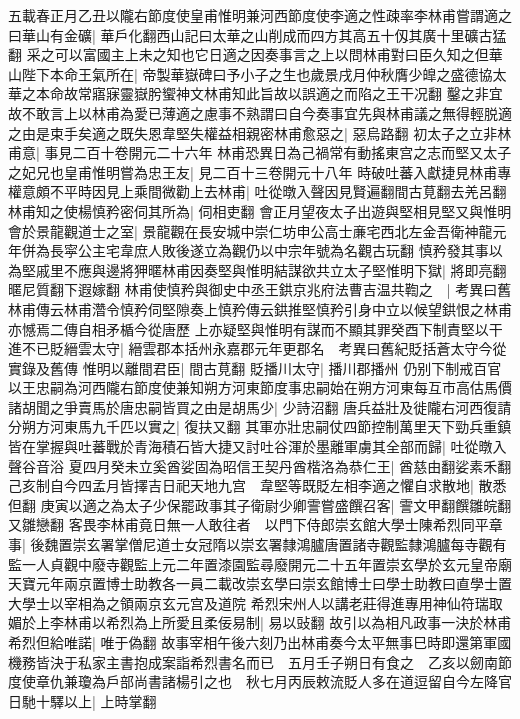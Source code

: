 五載春正月乙丑以隴右節度使皇甫惟明兼河西節度使李適之性疎率李林甫嘗謂適之曰華山有金礦|{
	華戶化翻西山記曰太華之山削成而四方其高五十仭其廣十里礦古猛翻}
采之可以富國主上未之知也它日適之因奏事言之上以問林甫對曰臣久知之但華山陛下本命王氣所在|{
	帝製華嶽碑曰予小子之生也歲景戌月仲秋膺少皥之盛德協太華之本命故常寤寐靈嶽肹蠁神文林甫知此旨故以誤適之而陷之王干况翻}
鑿之非宜故不敢言上以林甫為愛已薄適之慮事不熟謂曰自今奏事宜先與林甫議之無得輕脱適之由是束手矣適之既失恩韋堅失權益相親密林甫愈惡之|{
	惡烏路翻}
初太子之立非林甫意|{
	事見二百十卷開元二十六年}
林甫恐異日為己禍常有動搖東宫之志而堅又太子之妃兄也皇甫惟明嘗為忠王友|{
	見二百十三卷開元十八年}
時破吐蕃入獻捷見林甫專權意頗不平時因見上乘間微勸上去林甫|{
	吐從暾入聲因見賢遍翻間古莧翻去羌呂翻}
林甫知之使楊慎矜密伺其所為|{
	伺相吏翻}
會正月望夜太子出遊與堅相見堅又與惟明會於景龍觀道士之室|{
	景龍觀在長安城中崇仁坊申公高士亷宅西北左金吾衛神龍元年併為長寜公主宅韋庶人敗後遂立為觀仍以中宗年號為名觀古玩翻}
慎矜發其事以為堅戚里不應與邊將狎暱林甫因奏堅與惟明結謀欲共立太子堅惟明下獄|{
	將即亮翻暱尼質翻下遐嫁翻}
林甫使慎矜與御史中丞王鉷京兆府法曹吉温共鞫之　|{
	考異曰舊林甫傳云林甫濳令慎矜伺堅隙奏上慎矜傳云鉷推堅慎矜引身中立以候望鉷恨之林甫亦憾焉二傳自相矛楯今從唐歷}
上亦疑堅與惟明有謀而不顯其罪癸酉下制責堅以干進不已貶縉雲太守|{
	縉雲郡本括州永嘉郡元年更郡名　考異曰舊紀貶括蒼太守今從實錄及舊傳}
惟明以離間君臣|{
	間古莧翻}
貶播川太守|{
	播川郡播州}
仍别下制戒百官　以王忠嗣為河西隴右節度使兼知朔方河東節度事忠嗣始在朔方河東每互市高估馬價諸胡聞之爭賣馬於唐忠嗣皆買之由是胡馬少|{
	少詩沼翻}
唐兵益壯及徙隴右河西復請分朔方河東馬九千匹以實之|{
	復扶又翻}
其軍亦壯忠嗣仗四節控制萬里天下勁兵重鎮皆在掌握與吐蕃戰於青海積石皆大捷又討吐谷渾於墨離軍虜其全部而歸|{
	吐從暾入聲谷音浴}
夏四月癸未立奚酋娑固為昭信王契丹酋楷洛為恭仁王|{
	酋慈由翻娑素禾翻}
己亥制自今四孟月皆擇吉日祀天地九宫　韋堅等既貶左相李適之懼自求散地|{
	散悉但翻}
庚寅以適之為太子少保罷政事其子衛尉少卿霅嘗盛饌召客|{
	霅文甲翻饌雛皖翻又雛戀翻}
客畏李林甫竟日無一人敢往者　以門下侍郎崇玄館大學士陳希烈同平章事|{
	後魏置崇玄署掌僧尼道士女冠隋以崇玄署隸鴻臚唐置諸寺觀監隸鴻臚每寺觀有監一人貞觀中廢寺觀監上元二年置漆園監尋廢開元二十五年置崇玄學於玄元皇帝廟天寶元年兩京置博士助教各一員二載改崇玄學曰崇玄館博士曰學士助教曰直學士置大學士以宰相為之領兩京玄元宫及道院}
希烈宋州人以講老莊得進專用神仙符瑞取媚於上李林甫以希烈為上所愛且柔佞易制|{
	易以䜴翻}
故引以為相凡政事一決於林甫希烈但給唯諾|{
	唯于偽翻}
故事宰相午後六刻乃出林甫奏今太平無事巳時即還第軍國機務皆決于私家主書抱成案詣希烈書名而已　五月壬子朔日有食之　乙亥以劒南節度使章仇兼瓊為戶部尚書諸楊引之也　秋七月丙辰敕流貶人多在道逗留自今左降官日馳十驛以上|{
	上時掌翻}
